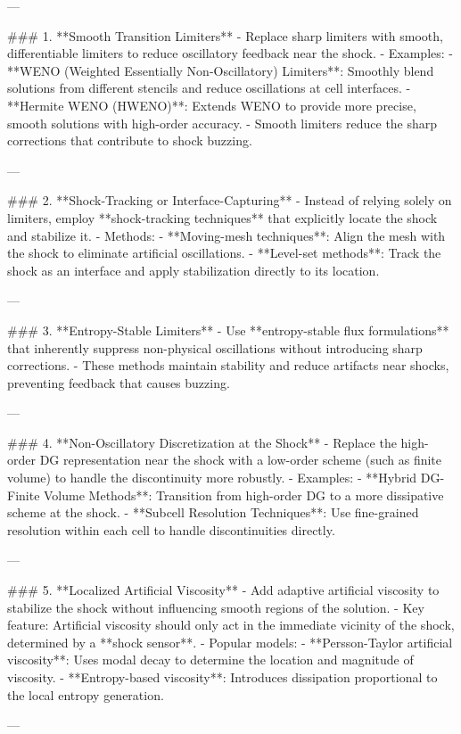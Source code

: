 ---

### 1. **Smooth Transition Limiters**
- Replace sharp limiters with smooth, differentiable limiters to reduce oscillatory feedback near the shock.
- Examples:
  - **WENO (Weighted Essentially Non-Oscillatory) Limiters**: Smoothly blend solutions from different stencils and reduce oscillations at cell interfaces.
  - **Hermite WENO (HWENO)**: Extends WENO to provide more precise, smooth solutions with high-order accuracy.
- Smooth limiters reduce the sharp corrections that contribute to shock buzzing.

---

### 2. **Shock-Tracking or Interface-Capturing**
- Instead of relying solely on limiters, employ **shock-tracking techniques** that explicitly locate the shock and stabilize it.
- Methods:
  - **Moving-mesh techniques**: Align the mesh with the shock to eliminate artificial oscillations.
  - **Level-set methods**: Track the shock as an interface and apply stabilization directly to its location.

---

### 3. **Entropy-Stable Limiters**
- Use **entropy-stable flux formulations** that inherently suppress non-physical oscillations without introducing sharp corrections.
- These methods maintain stability and reduce artifacts near shocks, preventing feedback that causes buzzing.

---

### 4. **Non-Oscillatory Discretization at the Shock**
- Replace the high-order DG representation near the shock with a low-order scheme (such as finite volume) to handle the discontinuity more robustly.
- Examples:
  - **Hybrid DG-Finite Volume Methods**: Transition from high-order DG to a more dissipative scheme at the shock.
  - **Subcell Resolution Techniques**: Use fine-grained resolution within each cell to handle discontinuities directly.

---

### 5. **Localized Artificial Viscosity**
- Add adaptive artificial viscosity to stabilize the shock without influencing smooth regions of the solution.
- Key feature: Artificial viscosity should only act in the immediate vicinity of the shock, determined by a **shock sensor**.
- Popular models:
  - **Persson-Taylor artificial viscosity**: Uses modal decay to determine the location and magnitude of viscosity.
  - **Entropy-based viscosity**: Introduces dissipation proportional to the local entropy generation.

---

